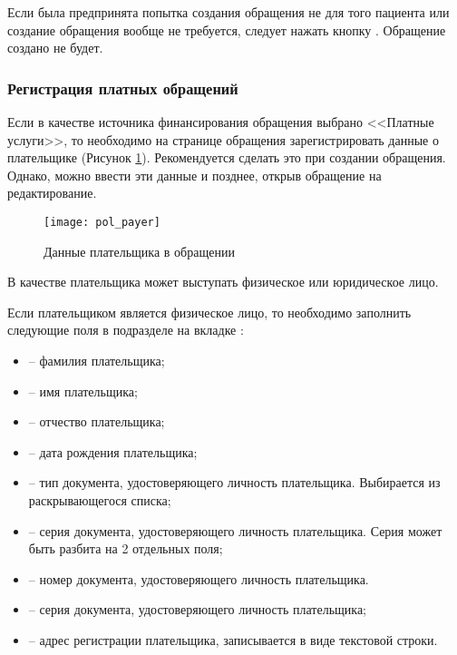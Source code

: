 Если была предпринята попытка создания обращения не для того пациента или создание обращения вообще не требуется, следует нажать кнопку . Обращение создано не будет.

\subsubsection{Регистрация платных обращений}

Если в качестве источника финансирования обращения выбрано <<Платные услуги>>, то необходимо на странице обращения зарегистрировать данные о плательщике (Рисунок \ref{img_pol_payer}). Рекомендуется сделать это при создании обращения. Однако, можно ввести эти данные и позднее, открыв обращение на редактирование. 

\begin{figure}[ht]\centering
	\texttt{[image: pol\_payer]}
	\caption{Данные плательщика в обращении}
	\label{img_pol_payer}
\end{figure}

В качестве плательщика может выступать физическое или юридическое лицо.

Если плательщиком является физическое лицо, то необходимо заполнить следующие поля в подразделе  на вкладке :
\begin{itemize}
	\item {} -- фамилия плательщика;
	\item {} -- имя плательщика;
	\item {} -- отчество плательщика;
	\item {} -- дата рождения плательщика;
	\item {} -- тип документа, удостоверяющего личность плательщика. Выбирается из раскрывающегося списка;
	\item {} -- серия документа, удостоверяющего личность плательщика. Серия может быть разбита на 2 отдельных поля;
	\item {} -- номер документа, удостоверяющего личность плательщика. 
	\item {} -- серия документа, удостоверяющего личность плательщика;
	\item {} -- адрес регистрации плательщика, записывается в виде текстовой строки. 
\end{itemize}


